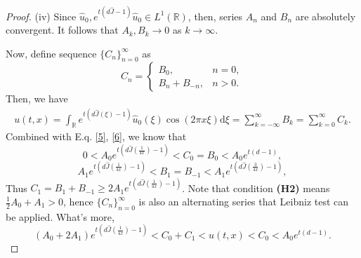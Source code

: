 \documentclass[10pt,a4paper]{amsart}
\newcommand{\R}{\mathbb{R}}
\newcommand{\dd}{\mathrm{d}}
\begin{document}
\begin{proof}
(iv) Since \(\hat{u}_0, e^{t(d\hat{J}-1)} \hat{u}_0\in L^1(\R)\), then, series \(A_n\) and \(B_n\) are absolutely convergent. It follows that \(A_k, B_k\rightarrow0\) as \(k\rightarrow \infty\).


Now, define sequence \(\{C_n\}_{n=0}^\infty\) as
\[C_n = 
\begin{cases} 
	B_0, & n = 0, \\ 
	B_n+B_{-n}, & n > 0. 
\end{cases}\]
Then, we have
\begin{align*}
u(t,x) = \int_{\mathbb{R}} e^{t(d\hat{J}(\xi)-1)}\hat{u}_0(\xi)\cos(2\pi x \xi)\dd \xi
= \sum_{k=-\infty}^{\infty} B_k=\sum_{k=0}^{\infty} C_k.
\end{align*}
 Combined with E.q. \eqref{5}, \eqref{6}, we know that 
 \[0<A_0e^{t\left( d\hat{J}\left( \frac{1}{4x} \right)-1 \right)} < C_0=B_0 < A_0e^{t(d-1)},\]
 	\[A_1 e^{t\left( d\hat{J}\left( \frac{1}{4x} \right)-1 \right)} < B_1=B_{-1} < A_1 e^{t\left( d\hat{J}\left( \frac{3}{4x} \right)-1 \right)}, \]
 Thus \(C_1=B_1+B_{-1}\geq2A_1 e^{t\left( d\hat{J}\left( \frac{1}{4x} \right)-1 \right)}\). Note that condition \textbf{(H2)} means \(\frac{1}{2}A_0+A_1>0\), hence \(\{C_n\}_{n=0}^{\infty}\) is also an alternating series that Leibniz test can be applied. What's more,
  \begin{equation}\label{7}
  	(A_0 + 2A_1)e^{t(d\hat{J}(\frac{1}{4x})-1)} <C_0+C_1< u(t,x) <C_0< A_0e^{t(d-1)}.
  \end{equation}
  

\end{proof}
\end{document}
